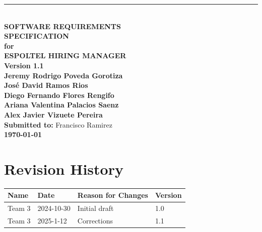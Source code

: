 \documentclass{scrreprt}
\date{November 14, 2024}
\def\myversion{1.1}
\begin{document}
\begin{titlepage}
    \begin{flushright}
        \rule{16cm}{1.5pt} \\[1cm]
        {\Huge\bfseries SOFTWARE REQUIREMENTS\\ SPECIFICATION}\\[1cm]
        {\LARGE\bfseries for}\\[1cm]
        {\Huge\textbf{ESPOLTEL HIRING MANAGER}}\\[2cm]
        {\Large\textbf{Version \myversion}}\\[1.5cm]
        
        {\Large\textbf{Jeremy Rodrigo Poveda Gorotiza}\\
        \textbf{José David Ramos Rios}\\
        \textbf{Diego Fernando Flores Rengifo}\\
        \textbf{Ariana Valentina Palacios Saenz}\\
        \textbf{Alex Javier Vizuete Pereira}}\\[1.5cm]
        
        {\Large\textbf{Submitted to:} Francisco Ramirez}\\[1.5cm]
        {\Large\textbf{\today}}
    \end{flushright}
    \vfill
\end{titlepage}

\chapter*{Revision History}
\setcounter{page}{1}
\begin{center}
	\begin{tabular}{@{} l l p{6.5cm} l @{}}
		\toprule
		\textbf{Name}    & \textbf{Date}   & \textbf{Reason for Changes} & \textbf{Version} \\ 
		\midrule
		Team 3           & 2024-10-30      & Initial draft               & 1.0              \\
		Team 3           & 2025-1-12      & Corrections               & 1.1              \\
		\bottomrule
	\end{tabular}
\end{center}

\tableofcontents

\listoffigures
\listoftables
\end{document}
